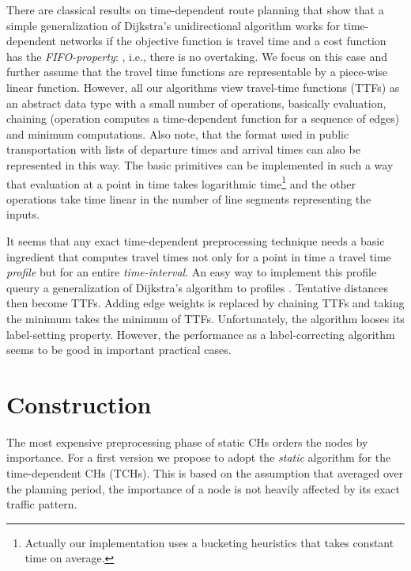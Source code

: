 \documentclass[12pt]{article}
\newcommand{\frage}[1]{}
\begin{document}
There are classical results on time-dependent route planning
\cite{CH66}  that show that a simple generalization of Dijkstra's
unidirectional algorithm works for time-dependent networks  if the
objective function is travel time and a cost function
 has the \emph{FIFO-property}:
, i.e., there is no
overtaking. We focus on this case and further assume that the travel
time functions are representable by a piece-wise linear
function. However, all our algorithms view travel-time functions (TTFs) as an
abstract data type with a small number of operations, basically
evaluation, chaining (operation  computes a time-dependent function for a sequence of edges) and minimum computations. Also note, that the
format used in public transportation with lists of departure times and
arrival times can also be represented in this way.
The basic primitives can be implemented in such a way that evaluation
at a point in time takes logarithmic time\footnote{Actually our implementation uses a bucketing heuristics that takes constant time on average.} 
and the other operations take
time linear in the number of line segments representing the inputs.


It seems that any exact time-dependent preprocessing technique needs a
basic ingredient that computes travel times not only for a point in
time a travel time \emph{profile}
but for an entire \emph{time-interval}.  An easy way to implement
this profile queury a generalization of Dijkstra's algorithm to profiles \cite{KS93}.
Tentative distances then become TTFs. Adding edge weights is replaced
by chaining TTFs and taking the minimum takes the minimum of
TTFs. Unfortunately, the algorithm looses its label-setting
property. However, the performance as a label-correcting algorithm
seems to be good in important practical cases.\frage{refs to refinements?}
 


\section{Construction}\label{s:construction}

The most expensive preprocessing phase of static CHs orders the nodes by importance.
For a first version we propose to adopt the \emph{static} algorithm for
the time-dependent CHs (TCHs).
This is based on the assumption that averaged over the planning
period, the importance of a node is not heavily affected by its
exact traffic pattern. 
\end{document}
